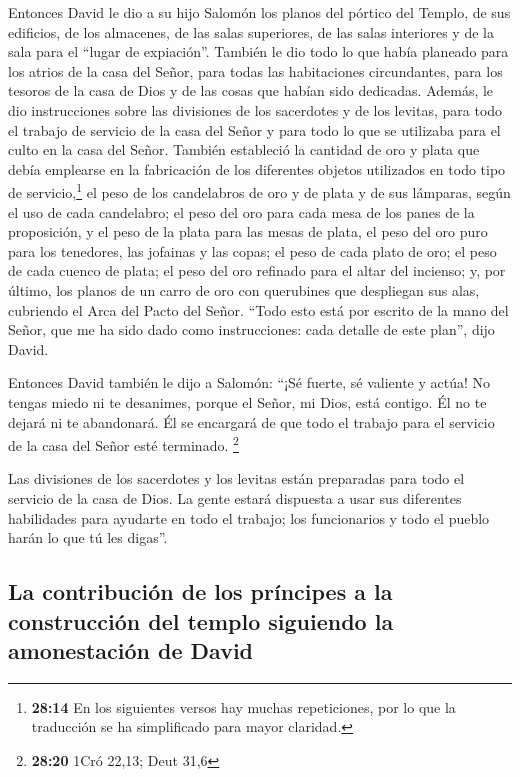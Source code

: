  Entonces David le dio a su hijo Salomón los planos del
pórtico del Templo, de sus edificios, de los almacenes, de las salas
superiores, de las salas interiores y de la sala para el ``lugar de
expiación''.  También le dio todo lo que había planeado
para los atrios de la casa del Señor, para todas las habitaciones
circundantes, para los tesoros de la casa de Dios y de las cosas que
habían sido dedicadas.  Además, le dio instrucciones
sobre las divisiones de los sacerdotes y de los levitas, para todo el
trabajo de servicio de la casa del Señor y para todo lo que se utilizaba
para el culto en la casa del Señor.  También estableció
la cantidad de oro y plata que debía emplearse en la fabricación de los
diferentes objetos utilizados en todo tipo de servicio,\footnote{\textbf{28:14}
  En los siguientes versos hay muchas repeticiones, por lo que la
  traducción se ha simplificado para mayor claridad.}  el
peso de los candelabros de oro y de plata y de sus lámparas, según el
uso de cada candelabro;  el peso del oro para cada mesa
de los panes de la proposición, y el peso de la plata para las mesas de
plata,  el peso del oro puro para los tenedores, las
jofainas y las copas; el peso de cada plato de oro; el peso de cada
cuenco de plata;  el peso del oro refinado para el altar
del incienso; y, por último, los planos de un carro de oro con
querubines que despliegan sus alas, cubriendo el Arca del Pacto del
Señor.  ``Todo esto está por escrito de la mano del
Señor, que me ha sido dado como instrucciones: cada detalle de este
plan'', dijo David.

 Entonces David también le dijo a Salomón: ``¡Sé fuerte,
sé valiente y actúa! No tengas miedo ni te desanimes, porque el Señor,
mi Dios, está contigo. Él no te dejará ni te abandonará. Él se encargará
de que todo el trabajo para el servicio de la casa del Señor esté
terminado. \footnote{\textbf{28:20} 1Cró 22,13; Deut 31,6}

 Las divisiones de los sacerdotes y los levitas están
preparadas para todo el servicio de la casa de Dios. La gente estará
dispuesta a usar sus diferentes habilidades para ayudarte en todo el
trabajo; los funcionarios y todo el pueblo harán lo que tú les digas''.

\hypertarget{la-contribuciuxf3n-de-los-pruxedncipes-a-la-construcciuxf3n-del-templo-siguiendo-la-amonestaciuxf3n-de-david}{%
\subsection{La contribución de los príncipes a la construcción del
templo siguiendo la amonestación de
David}\label{la-contribuciuxf3n-de-los-pruxedncipes-a-la-construcciuxf3n-del-templo-siguiendo-la-amonestaciuxf3n-de-david}}

